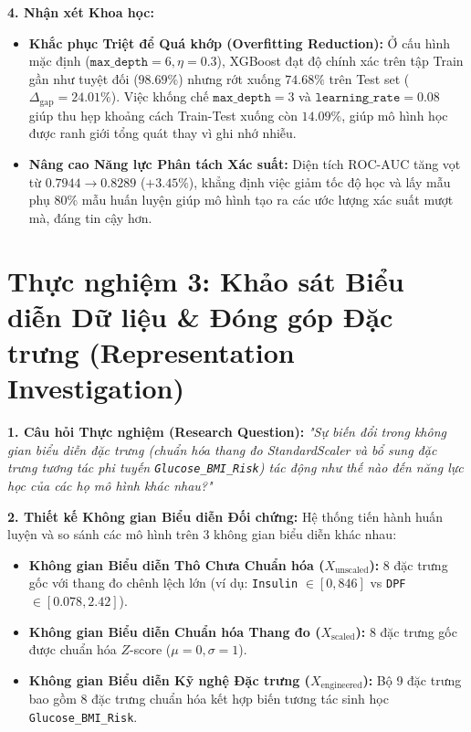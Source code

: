\documentclass[12pt,a4paper]{report}
\begin{document}
\textbf{4. Nhận xét Khoa học:}
\begin{itemize}[leftmargin=1.5em]
    \item \textbf{Khắc phục Triệt để Quá khớp (Overfitting Reduction):} Ở cấu hình mặc định ($\texttt{max\_depth}=6, \eta=0.3$), XGBoost đạt độ chính xác trên tập Train gần như tuyệt đối ($98.69\%$) nhưng rớt xuống $74.68\%$ trên Test set ($\Delta_{\text{gap}} = 24.01\%$). Việc khống chế $\texttt{max\_depth}=3$ và $\texttt{learning\_rate}=0.08$ giúp thu hẹp khoảng cách Train-Test xuống còn $14.09\%$, giúp mô hình học được ranh giới tổng quát thay vì ghi nhớ nhiễu.
    \item \textbf{Nâng cao Năng lực Phân tách Xác suất:} Diện tích $\text{ROC-AUC}$ tăng vọt từ $0.7944 \to \mathbf{0.8289}$ ($+3.45\%$), khẳng định việc giảm tốc độ học và lấy mẫu phụ $80\%$ mẫu huấn luyện giúp mô hình tạo ra các ước lượng xác suất mượt mà, đáng tin cậy hơn.
\end{itemize}

\section{Thực nghiệm 3: Khảo sát Biểu diễn Dữ liệu \& Đóng góp Đặc trưng (Representation Investigation)}

\textbf{1. Câu hỏi Thực nghiệm (Research Question):}
\textit{"Sự biến đổi trong không gian biểu diễn đặc trưng (chuẩn hóa thang đo StandardScaler và bổ sung đặc trưng tương tác phi tuyến \texttt{Glucose\_BMI\_Risk}) tác động như thế nào đến năng lực học của các họ mô hình khác nhau?"}

\textbf{2. Thiết kế Không gian Biểu diễn Đối chứng:}
Hệ thống tiến hành huấn luyện và so sánh các mô hình trên 3 không gian biểu diễn khác nhau:
\begin{itemize}[leftmargin=1.5em]
    \item \textbf{Không gian Biểu diễn Thô Chưa Chuẩn hóa ($X_{\text{unscaled}}$):} 8 đặc trưng gốc với thang đo chênh lệch lớn (ví dụ: \texttt{Insulin} $\in [0, 846]$ vs \texttt{DPF} $\in [0.078, 2.42]$).
    \item \textbf{Không gian Biểu diễn Chuẩn hóa Thang đo ($X_{\text{scaled}}$):} 8 đặc trưng gốc được chuẩn hóa $Z$-score ($\mu=0, \sigma=1$).
    \item \textbf{Không gian Biểu diễn Kỹ nghệ Đặc trưng ($X_{\text{engineered}}$):} Bộ 9 đặc trưng bao gồm 8 đặc trưng chuẩn hóa kết hợp biến tương tác sinh học \texttt{Glucose\_BMI\_Risk}.
\end{itemize}
\end{document}
